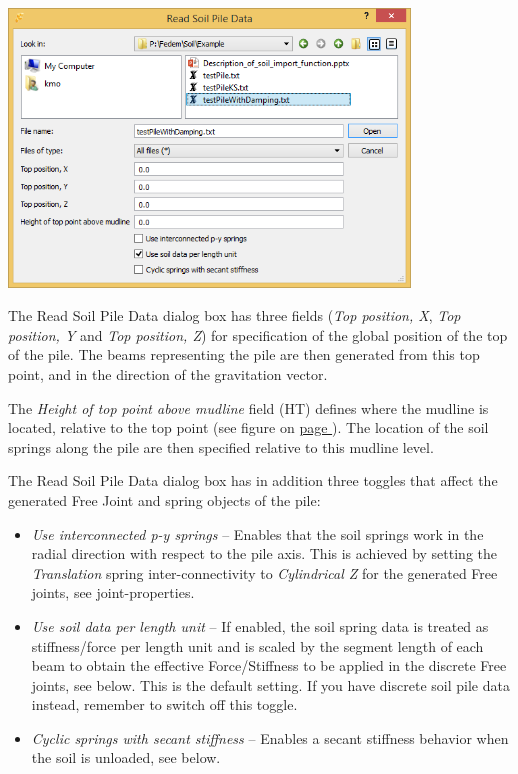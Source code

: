 \includegraphics[width=0.8\textwidth]{Figures/Dialogs/4-ImportSoilPile}

The Read Soil Pile Data dialog box has three fields ({\sl Top position, X},
{\sl Top position, Y} and {\sl Top position, Z}) for specification of the
global position of the top of the pile. The beams representing the pile are then
generated from this top point, and in the direction of the gravitation vector.

The {\sl Height of top point above mudline} field (HT) defines where the mudline
is located, relative to the top point
(see figure on \hyperref[soil-springs]{page }).
The location of the soil springs along the pile are then specified relative to
this mudline level.

The Read Soil Pile Data dialog box has in addition three toggles that affect the
generated Free Joint and spring objects of the pile:

\begin{itemize}
\item{\sl Use interconnected p-y springs} --
  Enables that the soil springs work in the radial direction with respect to
  the pile axis. This is achieved by setting the {\sl Translation} spring
  inter-connectivity to {\sl Cylindrical Z} for the generated Free joints,
  see 
  {joint-properties}.

\item{\sl Use soil data per length unit} --
  If enabled, the soil spring data is treated as stiffness/force per length unit
  and is scaled by the segment length of each beam to obtain the effective
  Force/Stiffness to be applied in the discrete Free joints,
  see  below.
  This is the default setting. If you have discrete soil pile data instead,
  remember to switch off this toggle.

\item{\sl Cyclic springs with secant stiffness} --
  Enables a secant stiffness behavior when the soil is unloaded,
  see 
  below.
\end{itemize}


